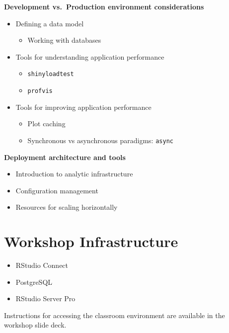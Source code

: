 \documentclass[]{book}
\providecommand{\tightlist}{%
  \setlength{\itemsep}{0pt}\setlength{\parskip}{0pt}}
\theoremstyle{definition}
\theoremstyle{definition}
\theoremstyle{definition}
\theoremstyle{remark}
\begin{document}
\textbf{Development vs.~Production environment considerations}

\begin{itemize}
\tightlist
\item
  Defining a data model

  \begin{itemize}
  \tightlist
  \item
    Working with databases
  \end{itemize}
\item
  Tools for understanding application performance

  \begin{itemize}
  \tightlist
  \item
    \texttt{shinyloadtest}
  \item
    \texttt{profvis}
  \end{itemize}
\item
  Tools for improving application performance

  \begin{itemize}
  \tightlist
  \item
    Plot caching
  \item
    Synchronous vs asynchronous paradigms: \texttt{async}
  \end{itemize}
\end{itemize}

\textbf{Deployment architecture and tools}

\begin{itemize}
\tightlist
\item
  Introduction to analytic infrastructure
\item
  Configuration management
\item
  Resources for scaling horizontally
\end{itemize}

\hypertarget{workshop-infrastructure}{%
\section{Workshop Infrastructure}\label{workshop-infrastructure}}

\begin{itemize}
\tightlist
\item
  RStudio Connect
\item
  PostgreSQL
\item
  RStudio Server Pro
\end{itemize}

Instructions for accessing the classroom environment are available in
the workshop slide deck.
\end{document}
